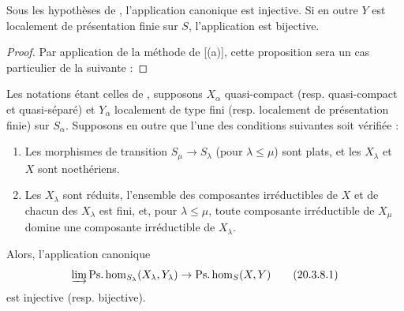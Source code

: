 \begin{proposition}[20.3.7]
\label{IV.20.3.7}
Sous les hypothèses de , l'application canonique  est injective.
Si en outre $Y$ est localement de présentation finie sur $S$, l'application  est bijective.
\end{proposition}

\begin{proof}
Par application de la méthode de [(a)], cette proposition sera un cas particulier de la suivante :
\end{proof}

\begin{proposition}[20.3.8]
Les notations étant celles de , supposons $X_\alpha$ quasi-compact (resp. quasi-compact et quasi-séparé) et $Y_\alpha$ localement de type fini (resp. localement de présentation finie) sur $S_\alpha$.
Supposons en outre que l'une des conditions suivantes soit vérifiée :
\begin{enumerate}[label=\emph{(\roman*)}]
  \item Les morphismes de transition $S_\mu\to S_\lambda$ (pour $\lambda\leq\mu$) sont plats, et les $X_\lambda$ et $X$ sont noethériens.
  \item Les $X_\lambda$ sont réduits, l'ensemble des composantes irréductibles de $X$ et de chacun des $X_\lambda$ est fini, et, pour $\lambda\leq\mu$, toute composante irréductible de $X_\mu$ domine une composante irréductible de $X_\lambda$.
\end{enumerate}
Alors, l'application canonique
\[
\label{IV.20.3.8.1}
  \varinjlim\operatorname{Ps.hom}_{S_\lambda}(X_\lambda,Y_\lambda)\to\operatorname{Ps.hom}_S(X,Y)
  \tag{20.3.8.1}
\]
est injective (resp. bijective).
\end{proposition}

